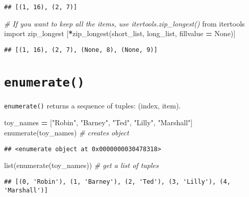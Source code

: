 \documentclass[
]{book}
\newenvironment{Shaded}{\begin{snugshade}}{\end{snugshade}}
\newcommand{\BuiltInTok}[1]{#1}
\newcommand{\CommentTok}[1]{\textcolor[rgb]{0.56,0.35,0.01}{\textit{#1}}}
\newcommand{\ImportTok}[1]{#1}
\newcommand{\NormalTok}[1]{#1}
\newcommand{\OperatorTok}[1]{\textcolor[rgb]{0.81,0.36,0.00}{\textbf{#1}}}
\newcommand{\StringTok}[1]{\textcolor[rgb]{0.31,0.60,0.02}{#1}}
\newcommand{\VariableTok}[1]{\textcolor[rgb]{0.00,0.00,0.00}{#1}}
\begin{document}
\begin{verbatim}
## [(1, 16), (2, 7)]
\end{verbatim}

\begin{Shaded}
\begin{Highlighting}[]
\CommentTok{\# If you want to keep all the items, use itertools.zip\_longest()}
\ImportTok{from}\NormalTok{ itertools }\ImportTok{import}\NormalTok{ zip\_longest}
\NormalTok{[}\OperatorTok{*}\NormalTok{zip\_longest(short\_list, long\_list, fillvalue }\OperatorTok{=} \VariableTok{None}\NormalTok{)]}
\end{Highlighting}
\end{Shaded}

\begin{verbatim}
## [(1, 16), (2, 7), (None, 8), (None, 9)]
\end{verbatim}

\hypertarget{enumerate}{%
\section{\texorpdfstring{\texttt{enumerate()}}{enumerate()}}\label{enumerate}}

\texttt{enumerate()} returns a sequence of tuples: (index, item).

\begin{Shaded}
\begin{Highlighting}[]
\NormalTok{toy\_names }\OperatorTok{=}\NormalTok{ [}\StringTok{"Robin"}\NormalTok{, }\StringTok{"Barney"}\NormalTok{, }\StringTok{"Ted"}\NormalTok{, }\StringTok{"Lilly"}\NormalTok{, }\StringTok{"Marshall"}\NormalTok{]}
\BuiltInTok{enumerate}\NormalTok{(toy\_names) }\CommentTok{\# creates object}
\end{Highlighting}
\end{Shaded}

\begin{verbatim}
## <enumerate object at 0x0000000030478318>
\end{verbatim}

\begin{Shaded}
\begin{Highlighting}[]
\BuiltInTok{list}\NormalTok{(}\BuiltInTok{enumerate}\NormalTok{(toy\_names)) }\CommentTok{\# get a list of tuples}
\end{Highlighting}
\end{Shaded}

\begin{verbatim}
## [(0, 'Robin'), (1, 'Barney'), (2, 'Ted'), (3, 'Lilly'), (4, 'Marshall')]
\end{verbatim}
\end{document}
